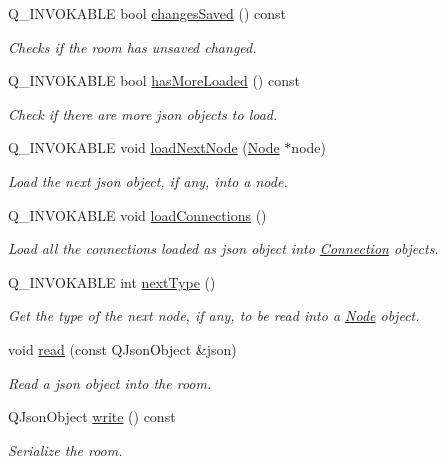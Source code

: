 \begin{DoxyCompactItemize}
Q\+\_\+\+I\+N\+V\+O\+K\+A\+B\+LE bool \mbox{\hyperlink{classRoom_af51c094a0286a3312b05e2e8425d10f1}{changes\+Saved}} () const
\begin{DoxyCompactList}\small\item\em Checks if the room has unsaved changed. \end{DoxyCompactList}\item 
Q\+\_\+\+I\+N\+V\+O\+K\+A\+B\+LE bool \mbox{\hyperlink{classRoom_abb662577c7ec3ea46d023a845e726cfa}{has\+More\+Loaded}} () const
\begin{DoxyCompactList}\small\item\em Check if there are more json objects to load. \end{DoxyCompactList}\item 
Q\+\_\+\+I\+N\+V\+O\+K\+A\+B\+LE void \mbox{\hyperlink{classRoom_ab1f1a0f0b4db3483b0f09667d81f2d61}{load\+Next\+Node}} (\mbox{\hyperlink{classNode}{Node}} $\ast$node)
\begin{DoxyCompactList}\small\item\em Load the next json object, if any, into a node. \end{DoxyCompactList}\item 
Q\+\_\+\+I\+N\+V\+O\+K\+A\+B\+LE void \mbox{\hyperlink{classRoom_a55b3be4272343997434bd5f690ba954e}{load\+Connections}} ()
\begin{DoxyCompactList}\small\item\em Load all the connections loaded as json object into \mbox{\hyperlink{classConnection}{Connection}} objects. \end{DoxyCompactList}\item 
Q\+\_\+\+I\+N\+V\+O\+K\+A\+B\+LE int \mbox{\hyperlink{classRoom_a20e9c4082ae977586a53f4f909869592}{next\+Type}} ()
\begin{DoxyCompactList}\small\item\em Get the type of the next node, if any, to be read into a \mbox{\hyperlink{classNode}{Node}} object. \end{DoxyCompactList}\item 
void \mbox{\hyperlink{classRoom_acb99b086249086eef4878fc315aadb91}{read}} (const Q\+Json\+Object \&json)
\begin{DoxyCompactList}\small\item\em Read a json object into the room. \end{DoxyCompactList}\item 
Q\+Json\+Object \mbox{\hyperlink{classRoom_a7e9c3212f3282b514b75a92d68727940}{write}} () const
\begin{DoxyCompactList}\small\item\em Serialize the room. \end{DoxyCompactList}\end{DoxyCompactItemize}
